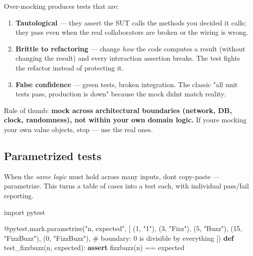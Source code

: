\documentclass[11pt]{article}
\providecommand{\tightlist}{\setlength{\itemsep}{1pt}\setlength{\parskip}{0pt}}
\newenvironment{Shaded}{\begin{snugshade}}{\end{snugshade}}
\newcommand{\AttributeTok}[1]{\textcolor[rgb]{0.16,0.50,0.73}{#1}}
\newcommand{\CommentTok}[1]{\textcolor[rgb]{0.48,0.49,0.49}{#1}}
\newcommand{\ControlFlowTok}[1]{\textcolor[rgb]{0.99,0.74,0.29}{\textbf{#1}}}
\newcommand{\DecValTok}[1]{\textcolor[rgb]{0.96,0.45,0.00}{#1}}
\newcommand{\ImportTok}[1]{\textcolor[rgb]{0.15,0.68,0.38}{#1}}
\newcommand{\KeywordTok}[1]{\textcolor[rgb]{0.81,0.81,0.76}{\textbf{#1}}}
\newcommand{\NormalTok}[1]{\textcolor[rgb]{0.81,0.81,0.76}{#1}}
\newcommand{\OperatorTok}[1]{\textcolor[rgb]{0.81,0.81,0.76}{#1}}
\newcommand{\StringTok}[1]{\textcolor[rgb]{0.96,0.31,0.31}{#1}}
\begin{document}
Over-mocking produces tests that are:

\begin{enumerate}
\def\labelenumi{\arabic{enumi}.}
\tightlist
\item
  \textbf{Tautological} --- they assert the SUT calls the methods you decided it calls; they pass even when the real collaborators are broken or the wiring is wrong.
\item
  \textbf{Brittle to refactoring} --- change \emph{how} the code computes a result (without changing the result) and every interaction assertion breaks. The test fights the refactor instead of protecting it.
\item
  \textbf{False confidence} --- green tests, broken integration. The classic "all unit tests pass, production is down" because the mock didn\textquotesingle t match reality.
\end{enumerate}

Rule of thumb: \textbf{mock across architectural boundaries (network, DB, clock, randomness), not within your own domain logic.} If you\textquotesingle re mocking your own value objects, stop --- use the real ones.

\subsection{Parametrized tests}\label{parametrized-tests}

When the \emph{same logic} must hold across many inputs, don\textquotesingle t copy-paste --- parametrize. This turns a table of cases into a test each, with individual pass/fail reporting.


\begin{Shaded}
\begin{Highlighting}[]
\ImportTok{import}\NormalTok{ pytest}

\AttributeTok{@pytest.mark.parametrize}\NormalTok{(}\StringTok{"n, expected"}\NormalTok{, [}
\NormalTok{    (}\DecValTok{1}\NormalTok{,  }\StringTok{"1"}\NormalTok{),}
\NormalTok{    (}\DecValTok{3}\NormalTok{,  }\StringTok{"Fizz"}\NormalTok{),}
\NormalTok{    (}\DecValTok{5}\NormalTok{,  }\StringTok{"Buzz"}\NormalTok{),}
\NormalTok{    (}\DecValTok{15}\NormalTok{, }\StringTok{"FizzBuzz"}\NormalTok{),}
\NormalTok{    (}\DecValTok{0}\NormalTok{,  }\StringTok{"FizzBuzz"}\NormalTok{),   }\CommentTok{\# boundary: 0 is divisible by everything}
\NormalTok{])}
\KeywordTok{def}\NormalTok{ test\_fizzbuzz(n, expected):}
    \ControlFlowTok{assert}\NormalTok{ fizzbuzz(n) }\OperatorTok{==}\NormalTok{ expected}
\end{Highlighting}
\end{Shaded}
\end{document}

